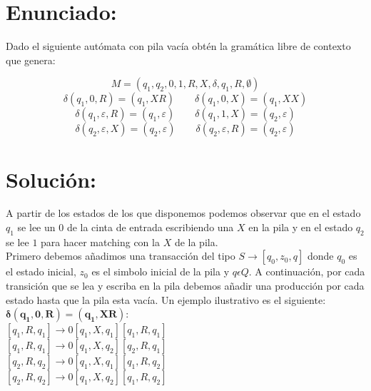 \documentclass[10pt,a4paper,spanish]{report}
\begin{document}
\section{Enunciado:}

\noindent
Dado el siguiente autómata con pila vacía obtén la gramática libre de contexto que genera:

\begin{displaymath}
	M = (q_1, q_2, 0, 1, R, X, \delta, q_1, R, \emptyset)
\end{displaymath}
\begin{displaymath}
	\delta(q_1, 0, R) = (q_1, XR) \qquad \delta(q_1, 0, X) = (q_1, XX)
\end{displaymath}
\begin{displaymath}
	\delta(q_1, \varepsilon, R) = (q_1, \varepsilon) \qquad \delta(q_1, 1, X) = (q_2, \varepsilon)
\end{displaymath}
\begin{displaymath}
	\delta(q_2, \varepsilon, X) = (q_2, \varepsilon) \qquad \delta(q_2, \varepsilon, R) = (q_2, \varepsilon)
\end{displaymath}

\section{Solución:}

\noindent
A partir de los estados de los que disponemos podemos observar que en el estado $q_1$ se lee un $0$ de la cinta de entrada escribiendo una $X$ en la pila y en el estado $q_2$ se lee $1$ para hacer matching con la $X$ de la pila.\\

\noindent
Primero debemos añadimos una transacción del tipo $S \rightarrow [q_0, z_0, q]$ donde $q_0$ es el estado inicial, $z_0$ es el simbolo inicial de la pila y $q \epsilon Q$. A continuación, por cada transición que se lea y escriba en la pila debemos añadir una producción por cada estado hasta que la pila esta vacía. Un ejemplo ilustrativo es el siguiente:\\

\noindent
$\mathbf{\delta(q_1, 0, R) = (q_1, XR)}$: \\
$[q_1, R, q_1] \rightarrow 0[q_1, X, q_1][q_1, R, q_1] $ \\
$[q_1, R, q_1] \rightarrow 0[q_1, X, q_2][q_2, R, q_1] $ \\
$[q_2, R, q_2] \rightarrow 0[q_1, X, q_1][q_1, R, q_2] $ \\
$[q_2, R, q_2] \rightarrow 0[q_1, X, q_2][q_1, R, q_2] $ \\
\end{document}
